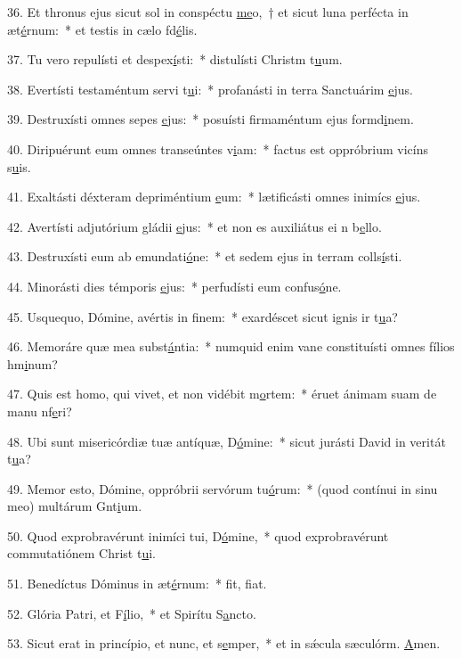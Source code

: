 36. Et thronus ejus sicut sol in conspéctu \uline{me}o,~† et sicut luna perfécta in æt\uline{é}rnum:~* et testis in cælo fd\uline{é}lis.\par 
37. Tu vero repulísti et despex\uline{í}sti:~* distulísti Christm t\uline{u}um.\par 
38. Evertísti testaméntum servi t\uline{u}i:~* profanásti in terra Sanctuárim \uline{e}jus.\par 
39. Destruxísti omnes sepes \uline{e}jus:~* posuísti firmaméntum ejus formd\uline{i}nem.\par 
40. Diripuérunt eum omnes transeúntes v\uline{i}am:~* factus est oppróbrium vicíns s\uline{u}is.\par 
41. Exaltásti déxteram depriméntium \uline{e}um:~* lætificásti omnes inimícs \uline{e}jus.\par 
42. Avertísti adjutórium gládii \uline{e}jus:~* et non es auxiliátus ei n b\uline{e}llo.\par 
43. Destruxísti eum ab emundati\uline{ó}ne:~* et sedem ejus in terram colls\uline{í}sti.\par 
44. Minorásti dies témporis \uline{e}jus:~* perfudísti eum confus\uline{ó}ne.\par 
45. Usquequo, Dómine, avértis in f\uline{i}nem:~* exardéscet sicut ignis ir t\uline{u}a?\par 
46. Memoráre quæ mea subst\uline{á}ntia:~* numquid enim vane constituísti omnes fílios hm\uline{i}num?\par 
47. Quis est homo, qui vivet, et non vidébit m\uline{o}rtem:~* éruet ánimam suam de manu nf\uline{e}ri?\par 
48. Ubi sunt misericórdiæ tuæ antíquæ, D\uline{ó}mine:~* sicut jurásti David in veritát t\uline{u}a?\par 
49. Memor esto, Dómine, oppróbrii servórum tu\uline{ó}rum:~* (quod contínui in sinu meo) multárum Gnt\uline{i}um.\par 
50. Quod exprobravérunt inimíci tui, D\uline{ó}mine,~* quod exprobravérunt commutatiónem Christ t\uline{u}i.\par 
51. Benedíctus Dóminus in æt\uline{é}rnum:~* fit, f\uline{i}at.\par 
52. Glória Patri, et F\uline{í}lio,~* et Spirítu S\uline{a}ncto.\par 
53. Sicut erat in princípio, et nunc, et s\uline{e}mper,~* et in sǽcula sæculórm. \uline{A}men.\par 
